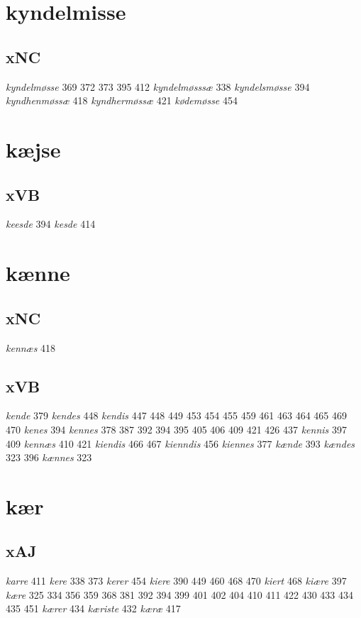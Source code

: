 \documentclass[a4paper,twocolumn]{article}
\begin{document}
\section{kyndelmisse}
\label{sec:org9e361b7}
\subsection{xNC}
\label{sec:orgcec9d46}
\emph{kyndelmøsse} 369 372 373 395 412 \emph{kyndelmøsssæ} 338 \emph{kyndelsmøsse} 394 \emph{kyndhenmøssæ} 418 \emph{kyndhermøssæ} 421 \emph{kødemøsse} 454 
\section{kæjse}
\label{sec:org9dbb4ef}
\subsection{xVB}
\label{sec:orgcc0f194}
\emph{keesde} 394 \emph{kesde} 414 
\section{kænne}
\label{sec:org4f33369}
\subsection{xNC}
\label{sec:org52da084}
\emph{kennæs} 418 
\subsection{xVB}
\label{sec:org9e96420}
\emph{kende} 379 \emph{kendes} 448 \emph{kendis} 447 448 449 453 454 455 459 461 463 464 465 469 470 \emph{kenes} 394 \emph{kennes} 378 387 392 394 395 405 406 409 421 426 437 \emph{kennis} 397 409 \emph{kennæs} 410 421 \emph{kiendis} 466 467 \emph{kienndis} 456 \emph{kiennes} 377 \emph{kænde} 393 \emph{kændes} 323 396 \emph{kænnes} 323 
\section{kær}
\label{sec:org6dc827e}
\subsection{xAJ}
\label{sec:org091fab2}
\emph{karre} 411 \emph{kere} 338 373 \emph{kerer} 454 \emph{kiere} 390 449 460 468 470 \emph{kiert} 468 \emph{kiære} 397 \emph{kære} 325 334 356 359 368 381 392 394 399 401 402 404 410 411 422 430 433 434 435 451 \emph{kærer} 434 \emph{kæriste} 432 \emph{kæræ} 417 
\end{document}

